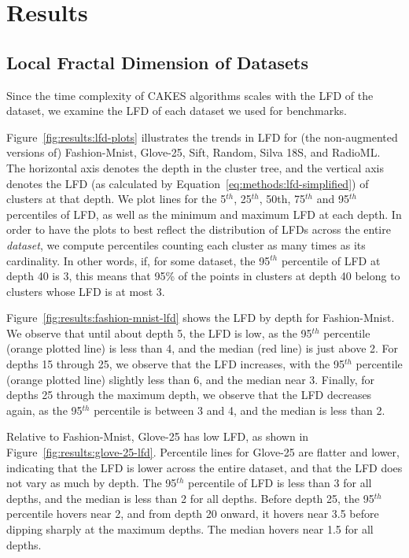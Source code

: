 \section{Results}
\label{sec:results}


\subsection{Local Fractal Dimension of Datasets}
\label{sec:results:lfd-of-datasets}

Since the time complexity of CAKES algorithms scales with the LFD of the dataset, we examine the LFD of each dataset we used for benchmarks.

Figure~\ref{fig:results:lfd-plots} illustrates the trends in LFD for (the non-augmented versions of) Fashion-Mnist, Glove-25, Sift, Random, Silva 18S, and RadioML.
The horizontal axis denotes the depth in the cluster tree, and the vertical axis denotes the LFD (as calculated by Equation~\ref{eq:methods:lfd-simplified}) of clusters at that depth.
We plot lines for the 5$^{th}$, 25$^{th}$, 50th, 75$^{th}$ and 95$^{th}$ percentiles of LFD, as well as the minimum and maximum LFD at each depth.
In order to have the plots to best reflect the distribution of LFDs across the entire \textit{dataset}, we compute percentiles counting each cluster as many times as its cardinality.
In other words, if, for some dataset, the 95$^{th}$ percentile of LFD at depth 40 is 3, this means that 95\% of the points in clusters at depth 40 belong to clusters whose LFD is at most 3.

Figure~\ref{fig:results:fashion-mnist-lfd} shows the LFD by depth for Fashion-Mnist.
We observe that until about depth 5, the LFD is low, as the 95$^{th}$ percentile (orange plotted line) is less than 4, and the median (red line) is just above 2.
For depths 15 through 25, we observe that the LFD increases, with the 95$^{th}$ percentile (orange plotted line) slightly less than 6, and the median near 3.
Finally, for depths 25 through the maximum depth, we observe that the LFD decreases again, as the 95$^{th}$ percentile is between 3 and 4, and the median is less than 2.

Relative to Fashion-Mnist, Glove-25 has low LFD, as shown in Figure~\ref{fig:results:glove-25-lfd}.
Percentile lines for Glove-25 are flatter and lower, indicating that the LFD is lower across the entire dataset, and that the LFD does not vary as much by depth.
The 95$^{th}$ percentile of LFD is less than 3 for all depths, and the median is less than 2 for all depths. 
Before depth 25, the 95$^{th}$ percentile hovers near 2, and from depth 20 onward, it hovers near 3.5 before dipping sharply at the maximum depths.
The median hovers near 1.5 for all depths.

